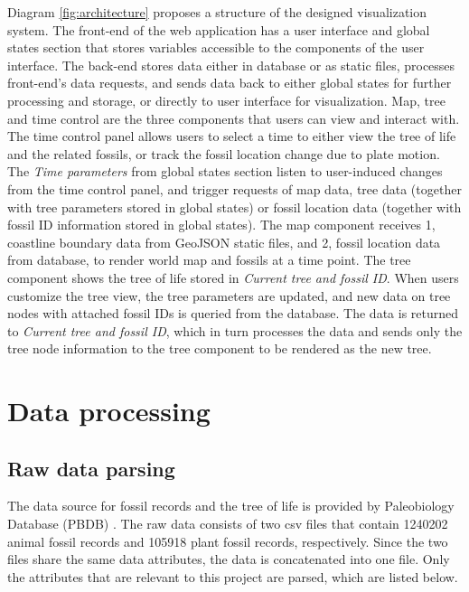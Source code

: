 \documentclass[11pt, a4paper,oneside,chapterprefix=false]{scrbook}
\begin{document}
Diagram \ref{fig:architecture} proposes a structure of the designed visualization system. The front-end of the web application has a user interface and global states section that stores variables accessible to the components of the user interface. The back-end stores data either in database or as static files, processes front-end's data requests, and sends data back to either global states for further processing and storage, or directly to user interface for visualization. Map, tree and time control are the three components that users can view and interact with. The time control panel allows users to select a time to either view the tree of life and the related fossils, or track the fossil location change due to plate motion. The \emph{Time parameters} from global states section listen to user-induced changes from the time control panel, and trigger requests of map data, tree data (together with tree parameters stored in global states) or fossil location data (together with fossil ID information stored in global states). The map component receives 1, coastline boundary data from GeoJSON static files, and 2, fossil location data from database, to render world map and fossils at a time point. The tree component shows the tree of life stored in \emph{Current tree and fossil ID}. When users customize the tree view, the tree parameters are updated, and new data on tree nodes with attached fossil IDs is queried from the database. The data is returned to \emph{Current tree and fossil ID}, which in turn processes the data and sends only the tree node information to the tree component to be rendered as the new tree. 

\section{Data processing} \label{sec:tec_data_processing}
\subsection{Raw data parsing} \label{subsec:raw_data_parsing}
The data source for fossil records and the tree of life is provided by Paleobiology Database (PBDB) \cite{peters2016paleobiology}. The raw data consists of two csv files that contain 1240202 animal fossil records and 105918 plant fossil records, respectively. Since the two files share the same data attributes, the data is concatenated into one file. Only the attributes that are relevant to this project are parsed, which are listed below.\\
\end{document}
